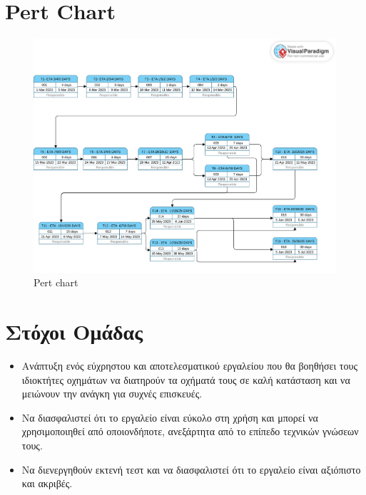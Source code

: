 \documentclass[11pt]{scrartcl} %
\begin{document}
\section{Pert Chart}

\begin{figure}[ht]
    \hspace{-0.5cm}
    \includegraphics[width = 1.2\linewidth,trim = 0cm 0cm 0cm 2cm, clip]{docs/Team-plan/assets/pertForProject.pdf}
    \caption{Pert chart}
\end{figure}

\section{Στόχοι Ομάδας}
\begin{itemize}
    \item Ανάπτυξη ενός εύχρηστου και αποτελεσματικού εργαλείου που θα βοηθήσει τους ιδιοκτήτες οχημάτων να διατηρούν τα οχήματά τους σε καλή κατάσταση και να μειώνουν την ανάγκη για συχνές επισκευές.
    \item Να διασφαλιστεί ότι το εργαλείο είναι εύκολο στη χρήση και μπορεί να χρησιμοποιηθεί από οποιονδήποτε, ανεξάρτητα από το επίπεδο τεχνικών γνώσεων τους.
    \item Να διενεργηθούν εκτενή τεστ και να διασφαλιστεί ότι το εργαλείο είναι αξιόπιστο και ακριβές.
\end{itemize}
\end{document}
